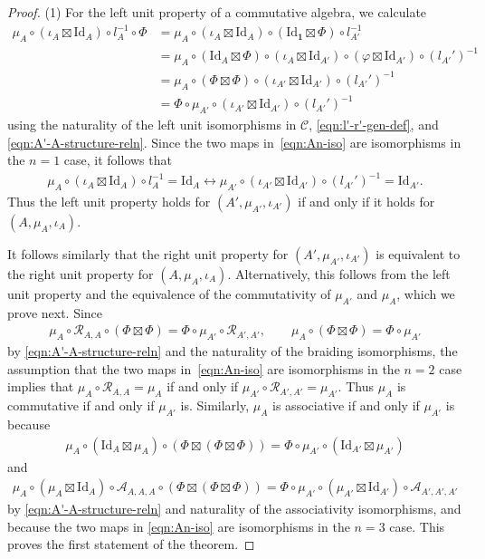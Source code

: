 \documentclass[pdftex]{sigma}
\numberwithin{equation}{section}
\theoremstyle{definition}
\begin{document}
\begin{proof}
(1) For the left unit property of a commutative algebra, we calculate
\begin{align*}
\mu_A\circ(\iota_A\boxtimes\mathrm{Id}_A)\circ l_A^{-1}\circ\Phi & = \mu_A\circ(\iota_A\boxtimes\mathrm{Id}_A)\circ(\mathrm{Id}_{\mathbf{1}}\boxtimes\Phi)\circ l_{A'}^{-1}\nonumber\\
& =\mu_A\circ(\mathrm{Id}_{A}\boxtimes\Phi)\circ(\iota_A\boxtimes\mathrm{Id}_{A'})\circ(\varphi\boxtimes\mathrm{Id}_{A'})\circ(l_{A'}')^{-1}\nonumber\\
& =\mu_A\circ(\Phi\boxtimes\Phi)\circ(\iota_{A'}\boxtimes\mathrm{Id}_{A'})\circ(l_{A'}')^{-1} \nonumber\\
&=\Phi\circ\mu_{A'}\circ(\iota_{A'}\boxtimes\mathrm{Id}_{A'})\circ(l_{A'}')^{-1}
\end{align*}
using the naturality of the left unit isomorphisms in $\mathcal{C}$, \eqref{eqn:l'-r'-gen-def}, and \eqref{eqn:A'-A-structure-reln}.
Since the two maps in~\eqref{eqn:An-iso} are isomorphisms in the $n=1$ case, it follows that
\begin{gather*}
\mu_A\circ(\iota_A\boxtimes\mathrm{Id}_A)\circ l_A^{-1} =\mathrm{Id}_A\longleftrightarrow \mu_{A'}\circ(\iota_{A'}\boxtimes\mathrm{Id}_{A'})\circ(l_{A'}')^{-1}=\mathrm{Id}_{A'}.
\end{gather*}
Thus the left unit property holds for $(A',\mu_{A'},\iota_{A'})$ if and only if it holds for $(A,\mu_A,\iota_A)$.

It follows similarly that the right unit property for $(A',\mu_{A'},\iota_{A'})$ is equivalent to the right unit property for $(A,\mu_A,\iota_A)$. Alternatively, this follows from the left unit property and the equivalence of the commutativity of $\mu_{A'}$ and $\mu_A$, which we prove next. Since
\begin{align*}
\mu_A\circ\mathcal{R}_{A,A}\circ(\Phi\boxtimes\Phi) =\Phi\circ\mu_{A'}\circ\mathcal{R}_{A',A'},\qquad\mu_A\circ(\Phi\boxtimes\Phi)=\Phi\circ\mu_{A'}
\end{align*}
by \eqref{eqn:A'-A-structure-reln} and the naturality of the braiding isomorphisms, the assumption that the two maps in~\eqref{eqn:An-iso} are isomorphisms in the $n=2$ case implies that $\mu_A\circ\mathcal{R}_{A,A}=\mu_A$ if and only if $\mu_{A'}\circ\mathcal{R}_{A',A'}=\mu_{A'}$. Thus $\mu_A$ is commutative if and only if $\mu_{A'}$ is. Similarly, $\mu_A$ is associative if and only if $\mu_{A'}$ is because
\begin{align*}
\mu_A\circ(\mathrm{Id}_A\boxtimes\mu_A)\circ(\Phi\boxtimes(\Phi\boxtimes\Phi)) =\Phi\circ\mu_{A'}\circ(\mathrm{Id}_{A'}\boxtimes\mu_{A'})
\end{align*}
and
\begin{gather*}
\mu_A\circ(\mu_A\boxtimes\mathrm{Id}_A)\circ\mathcal{A}_{A,A,A}\circ(\Phi\boxtimes(\Phi\boxtimes\Phi)) = \Phi\circ\mu_{A'}\circ(\mu_{A'}\boxtimes\mathrm{Id}_{A'})\circ\mathcal{A}_{A',A',A'}
\end{gather*}
by \eqref{eqn:A'-A-structure-reln} and naturality of the associativity isomorphisms, and because the two maps in \eqref{eqn:An-iso} are isomorphisms in the $n=3$ case.
This proves the first statement of the theorem.


\end{proof}
\end{document}
